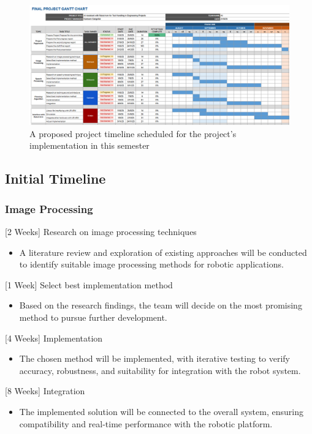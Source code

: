 \documentclass[12pt]{extarticle}
\begin{document}
\begin{figure}[htbp]
    \centering
    \includegraphics[width=0.8\linewidth]{images/Gantt_chart(2).png}
    \caption{A proposed project timeline scheduled for the project’s implementation in this semester}
    \label{fig:gantt-chart}
\end{figure}

\subsection{Initial Timeline}

\subsubsection{Image Processing}
[2 Weeks] Research on image processing techniques 
\begin{itemize}
    \item A literature review and exploration of existing approaches will be conducted to identify suitable image processing methods for robotic applications.
\end{itemize}
[1 Week] Select best implementation method
\begin{itemize}
    \item Based on the research findings, the team will decide on the most promising method to pursue further development.
\end{itemize}
[4 Weeks] Implementation
\begin{itemize}
    \item The chosen method will be implemented, with iterative testing to verify accuracy, robustness, and suitability for integration with the robot system.
\end{itemize}
[8 Weeks] Integration
\begin{itemize}
    \item The implemented solution will be connected to the overall system, ensuring compatibility and real-time performance with the robotic platform.
\end{itemize}
\end{document}
